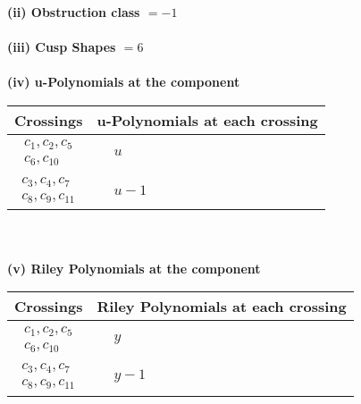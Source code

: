 \documentclass[1p]{elsarticle_modified}
\theoremstyle{definition}
\begin{document}
\flushleft \textbf{(ii) Obstruction class $= -1$}\\~\\
\flushleft \textbf{(iii) Cusp Shapes $= 6$}\\~\\
\newpage\renewcommand{\arraystretch}{1}
\flushleft \textbf{(iv) u-Polynomials at the component}\newline \\
\begin{tabular}{m{50pt}|m{274pt}}
Crossings & \hspace{64pt}u-Polynomials at each crossing \\
\hline $$\begin{aligned}c_{1},c_{2},c_{5}\\c_{6},c_{10}\end{aligned}$$&$\begin{aligned}
&u
\end{aligned}$\\
\hline $$\begin{aligned}c_{3},c_{4},c_{7}\\c_{8},c_{9},c_{11}\end{aligned}$$&$\begin{aligned}
&u-1
\end{aligned}$\\
\hline
\end{tabular}\\~\\
\newpage\renewcommand{\arraystretch}{1}
\flushleft \textbf{(v) Riley Polynomials at the component}\newline \\
\begin{tabular}{m{50pt}|m{274pt}}
Crossings & \hspace{64pt}Riley Polynomials at each crossing \\
\hline $$\begin{aligned}c_{1},c_{2},c_{5}\\c_{6},c_{10}\end{aligned}$$&$\begin{aligned}
&y
\end{aligned}$\\
\hline $$\begin{aligned}c_{3},c_{4},c_{7}\\c_{8},c_{9},c_{11}\end{aligned}$$&$\begin{aligned}
&y-1
\end{aligned}$\\
\hline
\end{tabular}\\~\\
\end{document}
